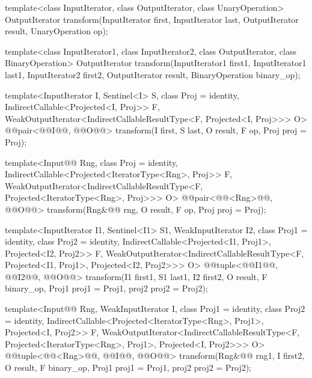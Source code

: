 %
\begin{removedblock}
\begin{itemdecl}
template<class InputIterator, class OutputIterator,
         class UnaryOperation>
  OutputIterator
    transform(InputIterator first, InputIterator last,
              OutputIterator result, UnaryOperation op);

template<class InputIterator1, class InputIterator2,
         class OutputIterator, class BinaryOperation>
  OutputIterator
    transform(InputIterator1 first1, InputIterator1 last1,
              InputIterator2 first2, OutputIterator result,
              BinaryOperation binary_op);
\end{itemdecl}
\end{removedblock}
\begin{addedblock}
\begin{itemdecl}
template<InputIterator I, Sentinel<I> S, class Proj = identity,
    IndirectCallable<Projected<I, Proj>> F,
    WeakOutputIterator<IndirectCallableResultType<F, Projected<I, Proj>>> O>
  @@pair<@@I@\newtxt{)}@, @@O@\newtxt{)}@>
  transform(I first, S last, O result, F op, Proj proj = Proj{});

template<Input@@ Rng, class Proj = identity,
    IndirectCallable<Projected<IteratorType<Rng>, Proj>> F,
    WeakOutputIterator<IndirectCallableResultType<F,
      Projected<IteratorType<Rng>, Proj>>> O>
  @@pair<@@<Rng>@\newtxt{)}@, @@O@\newtxt{)}@>
    transform(Rng&@\newtxt{\&}@ rng, O result, F op, Proj proj = Proj{});

template<InputIterator I1, Sentinel<I1> S1, WeakInputIterator I2,
    class Proj1 = identity, class Proj2 = identity,
    IndirectCallable<Projected<I1, Proj1>, Projected<I2, Proj2>> F,
    WeakOutputIterator<IndirectCallableResultType<F, Projected<I1, Proj1>,
      Projected<I2, Proj2>>> O>
  @@tuple<@@I1@\newtxt{)}@, @@I2@\newtxt{)}@, @@O@\newtxt{)}@>
    transform(I1 first1, S1 last1, I2 first2, O result,
              F binary_op, Proj1 proj1 = Proj1{}, proj2 proj2 = Proj2{});

template<Input@@ Rng, WeakInputIterator I,
    class Proj1 = identity, class Proj2 = identity,
    IndirectCallable<Projected<IteratorType<Rng>, Proj1>, Projected<I, Proj2>> F,
    WeakOutputIterator<IndirectCallableResultType<F,
      Projected<IteratorType<Rng>, Proj1>, Projected<I, Proj2>>> O>
  @@tuple<@@<Rng>@\newtxt{)}@, @@I@\newtxt{)}@, @@O@\newtxt{)}@>
    transform(Rng&@\newtxt{\&}@ rng1, I first2, O result,
              F binary_op, Proj1 proj1 = Proj1{}, proj2 proj2 = Proj2{});


\end{itemdecl}
\end{addedblock}
